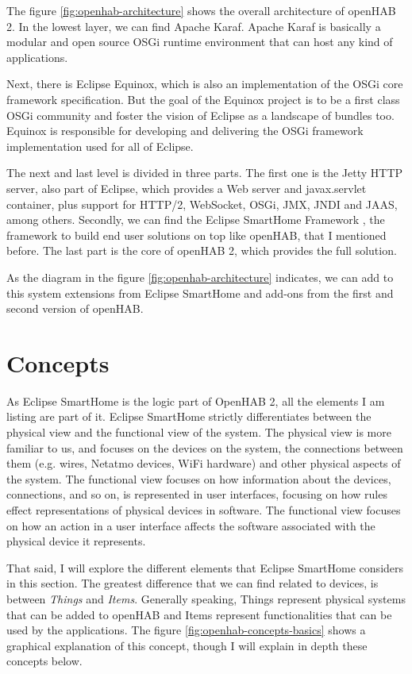 The figure \ref{fig:openhab-architecture} shows the overall architecture of openHAB 2. In the lowest layer, we can find Apache Karaf.
Apache Karaf is basically a modular and open source OSGi runtime environment that can host any kind of applications.\cite{apacheKaraf}
 
Next, there is Eclipse Equinox, which is also an implementation of the OSGi core framework specification. But the goal of the Equinox
project is to be a first class OSGi community and foster the vision of Eclipse as a landscape of bundles too. Equinox is responsible for
developing and delivering the OSGi framework implementation used for all of Eclipse.\cite{eclipseEquinox} 

The next and last level is divided in three parts. The first one is the Jetty HTTP server, also part of Eclipse, which provides a Web server 
and javax.servlet container, plus support for HTTP/2, WebSocket, OSGi, JMX, JNDI and JAAS, among others.\cite{eclipseJetty} Secondly,
we can find the Eclipse SmartHome Framework , the framework to build end user solutions on top like openHAB, that I mentioned 
before.\cite{eclipseSmartHomeDocs} The last part is the core of openHAB 2, which provides the full solution.

As the diagram in the figure \ref{fig:openhab-architecture} indicates, we can add to this system extensions from Eclipse SmartHome and
add-ons from the first and second version of openHAB.

\bigskip
\section{Concepts}
As Eclipse SmartHome is the logic part of OpenHAB 2, all the elements I am listing are part of it. Eclipse SmartHome strictly differentiates
between the physical view and the functional view of the system. The physical view is more familiar to us, and focuses on the devices
on the system, the connections between them (e.g. wires, Netatmo devices, WiFi hardware) and other physical aspects of the system.
The functional view focuses on how information about the devices, connections, and so on, is represented in user interfaces, focusing
on how rules effect representations of physical devices in software. The functional view focuses on how an action in a user interface
affects the software associated with the physical device it represents.

That said, I will explore the different elements that Eclipse SmartHome considers in this section. The greatest difference that we can find
related to devices, is between \textit{Things} and \textit{Items}. Generally speaking, Things represent physical systems that can be added
to openHAB and Items represent functionalities that can be used by the applications. The figure \ref{fig:openhab-concepts-basics} 
shows a graphical explanation of this concept, though I will explain in depth these concepts below.

